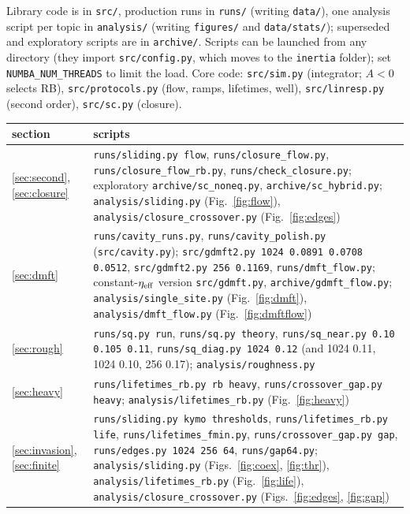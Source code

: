 \documentclass[10pt,a4paper]{article}
\begin{document}
Library code is in \texttt{src/}, production runs in \texttt{runs/} (writing \texttt{data/}), one analysis script per topic in \texttt{analysis/} (writing \texttt{figures/} and \texttt{data/stats/}); superseded and exploratory scripts are in \texttt{archive/}. Scripts can be launched from any directory (they import \texttt{src/config.py}, which moves to the \texttt{inertia} folder); set \texttt{NUMBA\_NUM\_THREADS} to limit the load. Core code: \texttt{src/sim.py} (integrator; $A<0$ selects RB), \texttt{src/protocols.py} (flow, ramps, lifetimes, well), \texttt{src/linresp.py} (second order), \texttt{src/sc.py} (closure).
\begin{center}\small
\begin{tabular}{p{3.4cm}p{12cm}}
\toprule
section & scripts \\
\midrule
\ref{sec:second}, \ref{sec:closure} & \texttt{runs/sliding.py flow}, \texttt{runs/closure\_flow.py}, \texttt{runs/closure\_flow\_rb.py}, \texttt{runs/check\_closure.py}; exploratory \texttt{archive/sc\_noneq.py}, \texttt{archive/sc\_hybrid.py}; \texttt{analysis/sliding.py} (Fig.~\ref{fig:flow}), \texttt{analysis/closure\_crossover.py} (Fig.~\ref{fig:edges}) \\
\ref{sec:dmft} & \texttt{runs/cavity\_runs.py}, \texttt{runs/cavity\_polish.py} (\texttt{src/cavity.py}); \texttt{src/gdmft2.py 1024 0.0891 0.0708 0.0512}, \texttt{src/gdmft2.py 256 0.1169}, \texttt{runs/dmft\_flow.py}; constant-$\eta_{\rm eff}$ version \texttt{src/gdmft.py}, \texttt{archive/gdmft\_flow.py}; \texttt{analysis/single\_site.py} (Fig.~\ref{fig:dmft}), \texttt{analysis/dmft\_flow.py} (Fig.~\ref{fig:dmftflow}) \\
\ref{sec:rough} & \texttt{runs/sq.py run}, \texttt{runs/sq.py theory}, \texttt{runs/sq\_near.py 0.10 0.105 0.11}, \texttt{runs/sq\_diag.py 1024 0.12} (and 1024 0.11, 1024 0.10, 256 0.17); \texttt{analysis/roughness.py} \\
\ref{sec:heavy} & \texttt{runs/lifetimes\_rb.py rb heavy}, \texttt{runs/crossover\_gap.py heavy}; \texttt{analysis/lifetimes\_rb.py} (Fig.~\ref{fig:heavy}) \\
\ref{sec:invasion}, \ref{sec:finite} & \texttt{runs/sliding.py kymo thresholds}, \texttt{runs/lifetimes\_rb.py life}, \texttt{runs/lifetimes\_fmin.py}, \texttt{runs/crossover\_gap.py gap}, \texttt{runs/edges.py 1024 256 64}, \texttt{runs/gap64.py}; \texttt{analysis/sliding.py} (Figs.~\ref{fig:coex}, \ref{fig:thr}), \texttt{analysis/lifetimes\_rb.py} (Fig.~\ref{fig:life}), \texttt{analysis/closure\_crossover.py} (Figs.~\ref{fig:edges}, \ref{fig:gap}) \\

\end{tabular}
\end{center}
\end{document}
